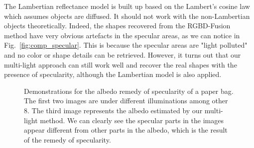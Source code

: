 The Lambertian reflectance model is built up based on the Lambert's cosine law which assumes objects are diffused.
It should not work with the non-Lambertian objects theoretically.
Indeed, the shapes recovered from the RGBD-Fusion method have very obvious artefacts in the specular areas, as we can notice in Fig.~\ref{fig:comp_specular}.
This is because the specular areas are "light polluted" and no color or shape details can be retrieved.
However, it turns out that our multi-light approach can still work well and recover the real shapes with the presence of specularity, although the Lambertian model is also applied.
\begin{figure}[H]
\centering
{}
\caption{Demonstrations for the albedo remedy of specularity of a paper bag. The first two images are under different illuminations among other 8. The third image represents the albedo estimated by our multi-light method. We can clearly see the specular parts in the images appear different from other parts in the albedo, which is the result of the remedy of specularity.}
\label{fig:specular_illu}
\end{figure}

